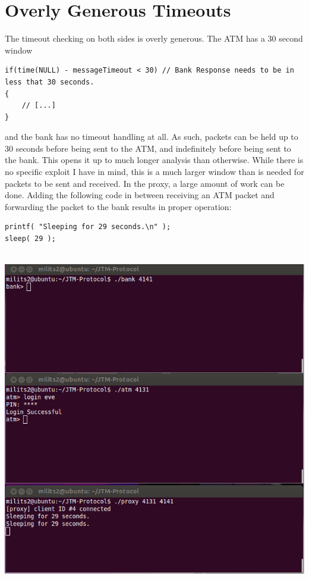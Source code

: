 \documentclass{article}
\begin{document}
\section{Overly Generous Timeouts}
The timeout checking on both sides is overly generous. The ATM has a 30 second window
\begin{lstlisting}
if(time(NULL) - messageTimeout < 30) // Bank Response needs to be in less that 30 seconds.
{
    // [...]
}
\end{lstlisting}
and the bank has no timeout handling at all. As such, packets can be held up to 30 seconds before being sent to the ATM, and indefinitely before being sent to the bank. This opens it up to much longer analysis than otherwise. While there is no specific exploit I have in mind, this is a much larger window than is needed for packets to be sent and received. In the proxy, a large amount of work can be done. Adding the following code in between receiving an ATM packet and forwarding the packet to the bank results in proper operation:
\begin{lstlisting}
printf( "Sleeping for 29 seconds.\n" );
sleep( 29 );
\end{lstlisting}
\\
\includegraphics[scale=0.5]{slowLogin.png}
\\
\end{document}
